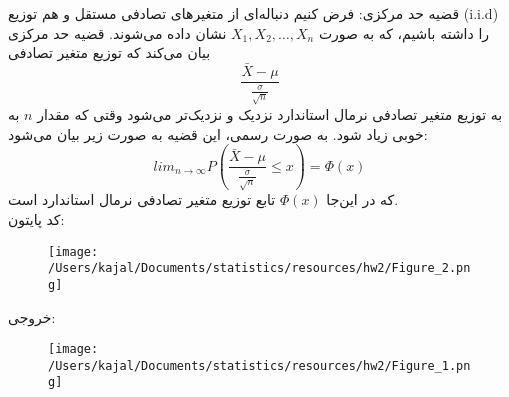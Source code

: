 \problem{}
\subproblem{}
قضیه حد مرکزی:
فرض کنیم دنباله‌ای از متغیرهای تصادفی مستقل و هم توزیع (i.i.d) را داشته باشیم،
 که به صورت \( X_1, X_2, \ldots, X_n \) نشان داده می‌شوند. قضیه حد مرکزی بیان می‌کند که توزیع متغیر تصادفی 
\[ \frac{\bar{X} - \mu}{\frac{\sigma}{\sqrt{n}}} \]
به توزیع متغیر تصادفی نرمال استاندارد نزدیک و نزدیک‌تر می‌شود وقتی که مقدار \( n \) 
به خوبی زیاد شود. به صورت رسمی، این قضیه به صورت زیر بیان می‌شود:
\[ lim_{{n \to \infty}} P\left(\frac{\bar{X} - \mu}{\frac{\sigma}{\sqrt{n}}} \leq x\right) = \Phi(x) \]
که در این‌جا \( \Phi(x) \) تابع توزیع متغیر تصادفی نرمال استاندارد است.\\
\subproblem{}
کد پایتون:\\
\begin{figure}[H]
	\centering
	\texttt{[image: /Users/kajal/Documents/statistics/resources/hw2/Figure\_2.png]}
\end{figure}
خروجی:\\
\begin{figure}[H]
	\centering
	\texttt{[image: /Users/kajal/Documents/statistics/resources/hw2/Figure\_1.png]}
\end{figure}
    
    
